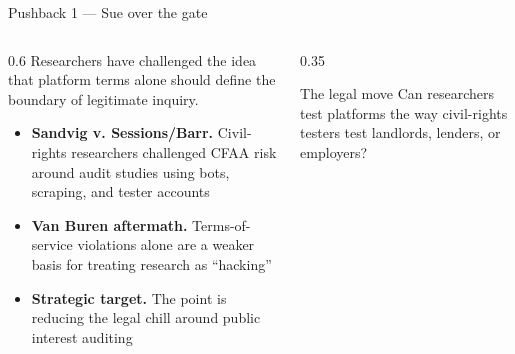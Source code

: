 \documentclass[9pt,aspectratio=169]{beamer}
\begin{document}
\begin{frame}{Pushback 1 --- Sue over the gate}
    \begin{columns}[T]
        \begin{column}{0.6\textwidth}
            Researchers have challenged the idea that platform terms alone should define the boundary of legitimate inquiry.

            \medskip

            \begin{itemize}\small
                \item \textbf{Sandvig v. Sessions/Barr.} Civil-rights researchers challenged CFAA risk around audit studies using bots, scraping, and tester accounts
                \item \textbf{Van Buren aftermath.} Terms-of-service violations alone are a weaker basis for treating research as ``hacking''
                \item \textbf{Strategic target.} The point is reducing the legal chill around public interest auditing
            \end{itemize}
        \end{column}
        \begin{column}{0.35\textwidth}
            \begin{alertblock}{The legal move}
                \small
                Can researchers test platforms the way civil-rights testers test landlords, lenders, or employers?
            \end{alertblock}
        \end{column}
    \end{columns}
\end{frame}
\end{document}
